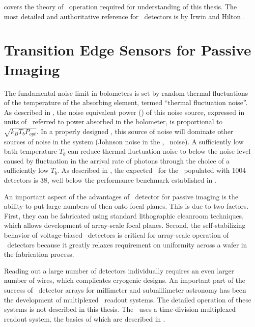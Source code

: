  covers the theory of \TES\ operation required for understanding of this thesis.
The most detailed and authoritative reference for \TES\ detectors is by Irwin and Hilton \cite{irwin_transition-edge_2005}.

\section{Transition Edge Sensors for Passive Imaging}

The fundamental noise limit in bolometers is set by random thermal fluctuations of the temperature of the absorbing element, termed ``thermal fluctuation noise''.
As described in , the noise equivalent power (\NEP) of this noise source, expressed in units of \pnoise\ referred to power absorbed in the bolometer, is proportional to $\sqrt{k_B T_b P_{opt}}$.
In a properly designed \TES, this source of noise will dominate other sources of noise in the system (Johnson noise in the \TES, \SQUID\ noise).
A sufficiently low bath temperature $T_b$ can reduce thermal fluctuation noise to below the noise level caused by fluctuation in the arrival rate of photons through the choice of a sufficiently low $T_b$.
As described in , the expected \NETD\ for the \Imager\ populated with 1004 detectors is \SI{38}{\mK}, well below the performance benchmark established in .

An important aspect of the advantages of \TES\ detector for passive imaging is the ability to put large numbers of then onto focal planes.
This is due to two factors.
First, they can be fabricated using standard lithographic cleanroom techniques, which allows development of array-scale focal planes.
Second, the self-stabilizing behavior of voltage-biased \TES\ detectors is critical for array-scale operation of \TES\ detectors because it greatly relaxes requirement on uniformity across a wafer in the fabrication process.

Reading out a large number of detectors individually requires an even larger number of wires, which complicates cryogenic designs.
An important part of the success of \TES\ detector arrays for millimeter and submillimeter astronomy has been the development of multiplexed \SQUID\ readout systems.
The detailed operation of these systems is not described in this thesis.
The \Imager\ uses a time-division multiplexed readout system, the basics of which are described in .
 
